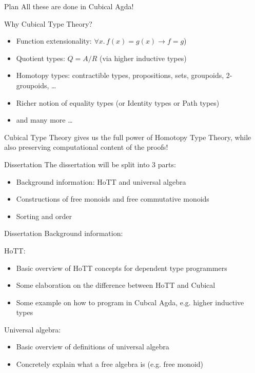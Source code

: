 \documentclass[9pt]{beamer}
\begin{document}
\begin{frame}{Plan}
  All these are done in \alert{Cubical Agda}!

  Why Cubical Type Theory?

  \begin{itemize}
  \item Function extensionality: $\forall x. \, f(x) = g(x) \rightarrow f = g$)
  \item Quotient types: $Q = A / R$ (via \alert{higher inductive types})
  \item Homotopy types: contractible types, propositions, sets, groupoids, 2-groupoids, \ldots
  \item Richer notion of \alert{equality types} (or Identity types or Path types)
  \item and many more \ldots
  \end{itemize}

  \alert{Cubical Type Theory} gives us the full power of \alert{Homotopy Type Theory},
  while also preserving \alert{computational content} of the proofs!

\end{frame}

\begin{frame}{Dissertation}
  The dissertation will be split into 3 parts:

  \begin{itemize}
    \item Background information: HoTT and universal algebra
    \item Constructions of free monoids and free commutative monoids
    \item Sorting and order
  \end{itemize}

\end{frame}

\begin{frame}{Dissertation}
  Background information:

  HoTT:
  \begin{itemize}
    \item Basic overview of HoTT concepts for dependent type programmers
    \item Some elaboration on the difference between HoTT and Cubical
    \item Some example on how to program in Cubcal Agda, e.g. \alert{higher inductive types}
  \end{itemize}

  Universal algebra:
  \begin{itemize}
    \item Basic overview of definitions of universal algebra
    \item Concretely explain what a \alert{free algebra} is (e.g. free monoid)
  \end{itemize}

\end{frame}
\end{document}
